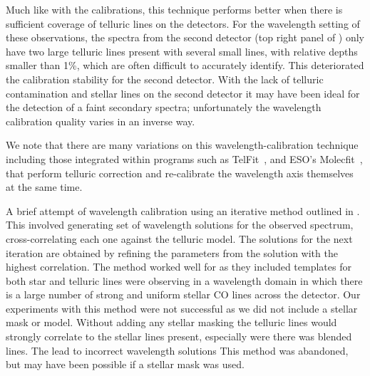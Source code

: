 Much like with the {\thar} calibrations, this technique performs better when there is sufficient coverage of telluric lines on the detectors. For the wavelength setting of these observations, the spectra from the second detector (top right panel of ) only have two large telluric lines present with several small lines, with relative depths smaller than 1\%, which are often difficult to accurately identify. This deteriorated the calibration stability for the second detector. With the lack of telluric contamination and stellar lines on the second detector it may have been ideal for the detection of a faint secondary spectra; unfortunately the wavelength calibration quality varies in an inverse way.


We note that there are many variations on this wavelength-calibration technique including those integrated within programs such as TelFit~\citet{gullikson_correcting_2014}, and ESO's Molecfit~\citet{smette_molecfit_2015}, that perform telluric correction and re-calibrate the wavelength axis themselves at the same time.


A brief attempt of wavelength calibration using an iterative method outlined in \cite{brogi_rotation_2016}. This involved generating set of wavelength solutions for the observed spectrum, cross-correlating each one against the telluric model. The solutions for the next iteration are obtained by refining the parameters from the solution with the highest correlation. 
The method worked well for \citet{brogi_rotation_2016} as they included templates for both star and telluric lines were observing in a wavelength domain in which there is a large number of strong and uniform stellar CO lines across the detector. 
Our experiments with this method were not successful as we did not include a stellar mask or model. Without adding any stellar masking the telluric lines would strongly correlate to the stellar lines present, especially were there was blended lines. The lead to incorrect wavelength solutions This method was abandoned, but may have been possible if a stellar mask was used.



